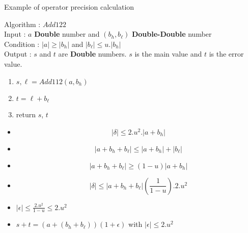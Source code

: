 \begin{frame}{Example of operator precision calculation}
 \tiny 
  \begin{algo}{Algorithm : \textbf{$Add122$}}\\
Input : $a$ \textbf{Double} number and $(b_h,b_{\ell})$  \textbf{Double-Double} number\\
Condition : $\lvert a \rvert \ge \lvert b_h \rvert $ and $\lvert b_{\ell} \rvert \le u. \lvert b_h \rvert$\\
Output : $s$ and $t$ are \textbf{Double} numbers. $s$ is the main value and $t$ is the error value.
\begin{enumerate}
\item $s,\ell = Add112(a,b_h)$\\ 
 \item   $t = \ell +b_{\ell}$\\ 
 \item   return $s$, $t$
\end{enumerate}
\end{algo}
\begin{itemize} 
 \item $$\lvert \delta \rvert \le 2.u^2. \lvert a + b_h \rvert $$
 \item $$ \lvert  a + b_h  + b_{\ell} \rvert \le \lvert a + b_h\rvert +  \lvert b_{\ell}\rvert$$
 \item $$ \lvert  a + b_h  + b_{\ell} \rvert \ge (1 - u)\lvert a + b_h\rvert $$
 \item $$\lvert \delta \rvert \le \lvert a + b_h + b_{\ell} \rvert (\frac{1}{1-u}).2.u^2$$
 \item $\lvert \epsilon \rvert \le \frac{2.u^2}{1-u} \le 2.u^2$
 \item $s+t = (a+(b_h + b_{\ell}))(1+\epsilon) $ with $\lvert \epsilon \rvert \le 2.u^2$
\end{itemize}
\end{frame}

